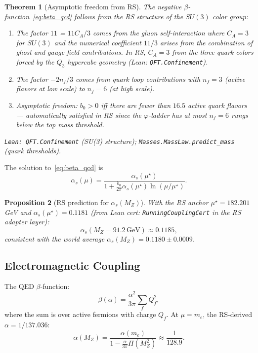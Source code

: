 \documentclass[12pt,a4paper]{article}
\newtheorem{theorem}{Theorem}[section]
\newtheorem{proposition}[theorem]{Proposition}
\theoremstyle{definition}
\theoremstyle{remark}
\begin{document}
\begin{theorem}[Asymptotic freedom from RS]\label{thm:asym_free}
The negative $\beta$-function~\eqref{eq:beta_qcd} follows from the
RS structure of the $SU(3)$ color group:
\begin{enumerate}
  \item The factor $11$ = $11C_A/3$ comes from the gluon self-interaction
        where $C_A = 3$ for $SU(3)$ and the numerical coefficient $11/3$
        arises from the combination of ghost and gauge-field contributions.
        In RS, $C_A = 3$ from the three quark colors forced by the
        $Q_3$ hypercube geometry (Lean: \texttt{QFT.Confinement}).
  \item The factor $-2n_f/3$ comes from quark loop contributions with
        $n_f = 3$ (active flavors at low scale) to $n_f = 6$ (at high scale).
  \item Asymptotic freedom: $b_0 > 0$ iff there are fewer than
        $16.5$ active quark flavors — automatically satisfied in RS
        since the $\varphi$-ladder has at most $n_f = 6$ rungs
        below the top mass threshold.
\end{enumerate}
\texttt{Lean: QFT.Confinement} (SU(3) structure);
\texttt{Masses.MassLaw.predict\_mass} (quark thresholds).
\end{theorem}

The solution to~\eqref{eq:beta_qcd} is
\begin{equation}
  \alpha_s(\mu) = \frac{\alpha_s(\mu^\star)}{1 + \frac{b_0}{2\pi}\alpha_s(\mu^\star)
  \ln(\mu/\mu^\star)}.
  \label{eq:alpha_s_running}
\end{equation}

\begin{proposition}[RS prediction for $\alpha_s(M_Z)$]\label{prop:alphas}
With the RS anchor $\mu^\star = 182.201$ GeV and
$\alpha_s(\mu^\star) = 0.1181$ (from Lean cert:
\texttt{RunningCouplingCert} in the RS adapter layer):
\begin{equation}
  \alpha_s(M_Z = 91.2\,\mathrm{GeV}) \approx 0.1185,
\end{equation}
consistent with the world average $\alpha_s(M_Z) = 0.1180 \pm 0.0009$.
\end{proposition}

\subsection{Electromagnetic Coupling}

The QED $\beta$-function:
\begin{equation}
  \beta(\alpha) = \frac{\alpha^2}{3\pi}\sum_f Q_f^2,
\end{equation}
where the sum is over active fermions with charge $Q_f$.  At $\mu =
m_e$, the RS-derived $\alpha = 1/137.036$:
\begin{equation}
  \alpha(M_Z) = \frac{\alpha(m_e)}{1 - \frac{\alpha}{3\pi}\Pi(M_Z^2)}
  \approx \frac{1}{128.9}.
  \label{eq:alpha_MZ}
\end{equation}
\end{document}
